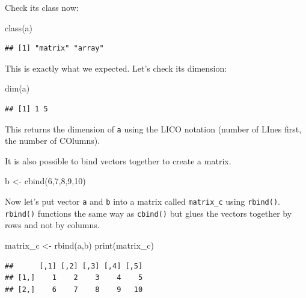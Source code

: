 \documentclass[
]{article}
\newenvironment{Shaded}{\begin{snugshade}}{\end{snugshade}}
\newcommand{\DecValTok}[1]{\textcolor[rgb]{0.00,0.00,0.81}{#1}}
\newcommand{\FunctionTok}[1]{\textcolor[rgb]{0.00,0.00,0.00}{#1}}
\newcommand{\NormalTok}[1]{#1}
\newcommand{\OtherTok}[1]{\textcolor[rgb]{0.56,0.35,0.01}{#1}}
\begin{document}
Check its class now:

\begin{Shaded}
\begin{Highlighting}[]
\FunctionTok{class}\NormalTok{(a)}
\end{Highlighting}
\end{Shaded}

\begin{verbatim}
## [1] "matrix" "array"
\end{verbatim}

This is exactly what we expected. Let's check its dimension:

\begin{Shaded}
\begin{Highlighting}[]
\FunctionTok{dim}\NormalTok{(a)}
\end{Highlighting}
\end{Shaded}

\begin{verbatim}
## [1] 1 5
\end{verbatim}

This returns the dimension of \texttt{a} using the LICO notation (number of LInes first, the number of COlumns).

It is also possible to bind vectors together to create a matrix.

\begin{Shaded}
\begin{Highlighting}[]
\NormalTok{b }\OtherTok{\textless{}{-}} \FunctionTok{cbind}\NormalTok{(}\DecValTok{6}\NormalTok{,}\DecValTok{7}\NormalTok{,}\DecValTok{8}\NormalTok{,}\DecValTok{9}\NormalTok{,}\DecValTok{10}\NormalTok{)}
\end{Highlighting}
\end{Shaded}

Now let's put vector \texttt{a} and \texttt{b} into a matrix called \texttt{matrix\_c} using \texttt{rbind()}.
\texttt{rbind()} functions the same way as \texttt{cbind()} but glues the vectors together by rows and not by columns.

\begin{Shaded}
\begin{Highlighting}[]
\NormalTok{matrix\_c }\OtherTok{\textless{}{-}} \FunctionTok{rbind}\NormalTok{(a,b)}
\FunctionTok{print}\NormalTok{(matrix\_c)}
\end{Highlighting}
\end{Shaded}

\begin{verbatim}
##      [,1] [,2] [,3] [,4] [,5]
## [1,]    1    2    3    4    5
## [2,]    6    7    8    9   10
\end{verbatim}
\end{document}
